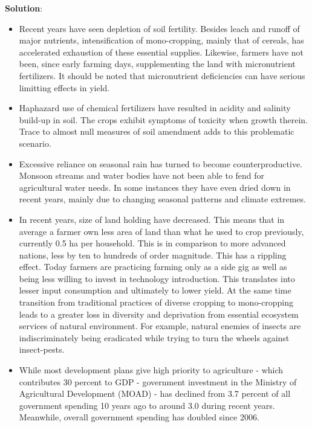 \documentclass[
  openany]{book}
\newenvironment{solution}{ {\bfseries Solution}:}{}
\begin{document}
\begin{questions}
\begin{solution}
\begin{itemize}
\item Recent years have seen depletion of soil fertility. Besides leach and runoff of major nutrients, intensification of mono-cropping, mainly that of cereals, has accelerated exhaustion of these essential supplies. Likewise, farmers have not been, since early farming days, supplementing the land with micronutrient fertilizers. It should be noted that micronutrient deficiencies can have serious limitting effects in yield.
\item Haphazard use of chemical fertilizers have resulted in acidity and salinity build-up in soil. The crops exhibit symptoms of toxicity when growth therein. Trace to almost null measures of soil amendment adds to this problematic scenario.
\item Excessive reliance on seasonal rain has turned to become counterproductive. Monsoon streams and water bodies have not been able to fend for agricultural water needs. In some instances they have even dried down in recent years, mainly due to changing seasonal patterns and climate extremes.
\item In recent years, size of land holding have decreased. This means that in average a farmer own less area of land than what he used to crop previously, currently 0.5 ha per household. This is in comparison to more advanced nations, less by ten to hundreds of order magnitude. This has a rippling effect. Today farmers are practicing farming only as a side gig as well as being less willing to invest in technology introduction. This translates into lesser input consumption and ultimately to lower yield. At the same time transition from traditional practices of diverse cropping to mono-cropping leads to a greater loss in diversity and deprivation from essential ecosystem services of natural environment. For example, natural enemies of insects are indiscriminately being eradicated while trying to turn the wheels against insect-pests. 
\item While most development plans give high priority to agriculture - which contributes 30 percent to GDP - government investment in the Ministry of Agricultural Development (MOAD) - has declined from 3.7 percent of all government spending 10 years ago to around 3.0 during recent years. Meanwhile, overall government spending has doubled since 2006.

\end{itemize}
\end{solution}


\end{questions}
\end{document}
